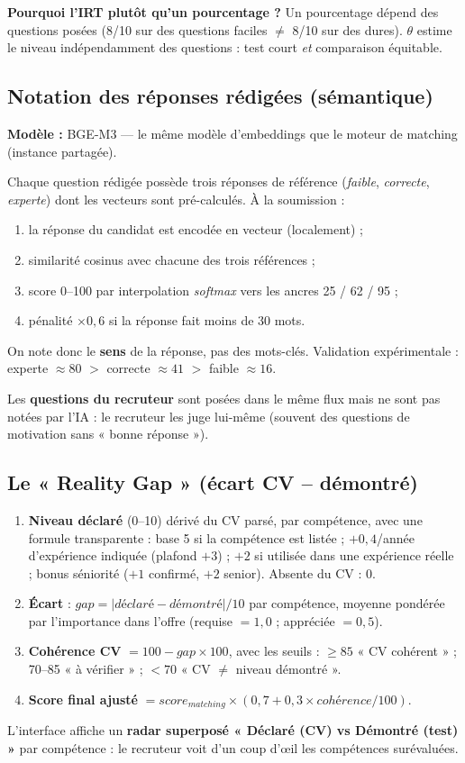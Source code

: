 \documentclass[11pt,a4paper]{article}
\begin{document}
\textbf{Pourquoi l'IRT plutôt qu'un pourcentage ?} Un pourcentage dépend des questions
posées (8/10 sur des questions faciles $\neq$ 8/10 sur des dures). $\theta$ estime le
niveau indépendamment des questions : test court \emph{et} comparaison équitable.

\subsection{Notation des réponses rédigées (sémantique)}
\textbf{Modèle :} BGE-M3 --- le même modèle d'embeddings que le moteur de matching
(instance partagée).

Chaque question rédigée possède trois réponses de référence (\emph{faible},
\emph{correcte}, \emph{experte}) dont les vecteurs sont pré-calculés. À la soumission :
\begin{enumerate}
  \item la réponse du candidat est encodée en vecteur (localement) ;
  \item similarité cosinus avec chacune des trois références ;
  \item score 0--100 par interpolation \emph{softmax} vers les ancres 25 / 62 / 95 ;
  \item pénalité $\times 0{,}6$ si la réponse fait moins de 30 mots.
\end{enumerate}
On note donc le \textbf{sens} de la réponse, pas des mots-clés. Validation
expérimentale : experte $\approx 80$ $>$ correcte $\approx 41$ $>$ faible $\approx 16$.

Les \textbf{questions du recruteur} sont posées dans le même flux mais ne sont pas
notées par l'IA : le recruteur les juge lui-même (souvent des questions de motivation
sans « bonne réponse »).

\subsection{Le « Reality Gap » (écart CV -- démontré)}
\begin{enumerate}
  \item \textbf{Niveau déclaré} (0--10) dérivé du CV parsé, par compétence, avec une
        formule transparente : base 5 si la compétence est listée ; $+0{,}4$/année
        d'expérience indiquée (plafond $+3$) ; $+2$ si utilisée dans une expérience
        réelle ; bonus séniorité ($+1$ confirmé, $+2$ senior). Absente du CV : 0.
  \item \textbf{Écart} : $gap = |déclaré - démontré| / 10$ par compétence, moyenne
        pondérée par l'importance dans l'offre (requise $=1{,}0$ ; appréciée $=0{,}5$).
  \item \textbf{Cohérence CV} $= 100 - gap \times 100$, avec les seuils :
        $\geq 85$ « CV cohérent » ; 70--85 « à vérifier » ; $< 70$ « CV $\neq$ niveau
        démontré ».
  \item \textbf{Score final ajusté} $= score_{matching} \times (0{,}7 + 0{,}3 \times
        cohérence/100)$.
\end{enumerate}
L'interface affiche un \textbf{radar superposé « Déclaré (CV) vs Démontré (test) »} par
compétence : le recruteur voit d'un coup d'\oe il les compétences surévaluées.
\end{document}
